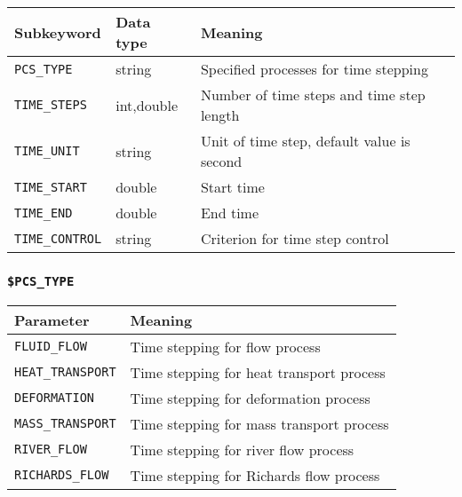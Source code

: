 \begin{tabular*}{12.773cm}{|p{}|p{1.5cm}|p{7cm}|} \hline
Subkeyword             & Data type & Meaning \\ \hline \hline
%
\texttt{PCS\_TYPE}     & string     &  Specified processes for time stepping \\
\texttt{TIME\_STEPS}   & int,double &  Number of time steps and time step length \\
\texttt{TIME\_UNIT}    & string     &  Unit of time step, default value is second \\
\texttt{TIME\_START}   & double     &  Start time \\
\texttt{TIME\_END}     & double     &  End time \\
\texttt{TIME\_CONTROL} & string     &  Criterion for time step control \\
\hline
\end{tabular*}

\subsubsection{\texttt{\$PCS\_TYPE}}

\begin{tabular*}{10.853cm}{|p{}|p{7cm}|} \hline
Parameter          &Meaning \\ \hline \hline
%
\texttt{FLUID\_FLOW}     &Time stepping for flow process \\
\texttt{HEAT\_TRANSPORT} &Time stepping for heat transport process \\
\texttt{DEFORMATION}     &Time stepping for deformation process \\
\texttt{MASS\_TRANSPORT} &Time stepping for mass transport process \\
\texttt{RIVER\_FLOW}     &Time stepping for river flow process \\
\texttt{RICHARDS\_FLOW}     &Time stepping for Richards flow process \\
\hline
\end{tabular*}

